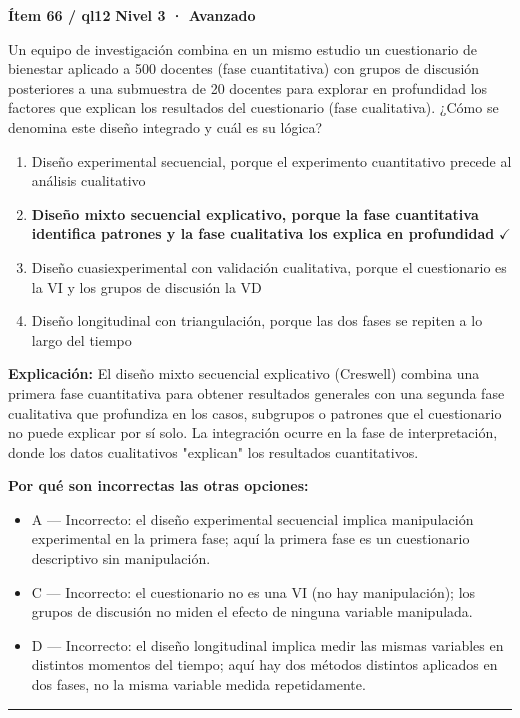 \documentclass[12pt,a4paper]{article}
\begin{document}
\begin{mdframed}[backgroundcolor=fondogris,linecolor=rojo,linewidth=1pt,innerleftmargin=10pt,innerrightmargin=10pt,innertopmargin=7pt,innerbottommargin=7pt]
\textbf{Ítem 66 / ql12} \hfill {\small\bfseries\color{rojo} Nivel 3 · Avanzado}
\end{mdframed}

Un equipo de investigación combina en un mismo estudio un cuestionario de bienestar aplicado a 500 docentes (fase cuantitativa) con grupos de discusión posteriores a una submuestra de 20 docentes para explorar en profundidad los factores que explican los resultados del cuestionario (fase cualitativa). ¿Cómo se denomina este diseño integrado y cuál es su lógica?

\begin{enumerate}
  \item[A.] Diseño experimental secuencial, porque el experimento cuantitativo precede al análisis cualitativo
  \item[\textbf{\color{verde}B.}] \textbf{\color{verde} Diseño mixto secuencial explicativo, porque la fase cuantitativa identifica patrones y la fase cualitativa los explica en profundidad} \hfill $\checkmark$
  \item[C.] Diseño cuasiexperimental con validación cualitativa, porque el cuestionario es la VI y los grupos de discusión la VD
  \item[D.] Diseño longitudinal con triangulación, porque las dos fases se repiten a lo largo del tiempo
\end{enumerate}

\noindent\textbf{\color{azul}Explicación:} El diseño mixto secuencial explicativo (Creswell) combina una primera fase cuantitativa para obtener resultados generales con una segunda fase cualitativa que profundiza en los casos, subgrupos o patrones que el cuestionario no puede explicar por sí solo. La integración ocurre en la fase de interpretación, donde los datos cualitativos "explican" los resultados cuantitativos.

\noindent\textbf{\color{gris}Por qué son incorrectas las otras opciones:}
\begin{itemize}
  \item {\small A — Incorrecto: el diseño experimental secuencial implica manipulación experimental en la primera fase; aquí la primera fase es un cuestionario descriptivo sin manipulación.}
  \item {\small C — Incorrecto: el cuestionario no es una VI (no hay manipulación); los grupos de discusión no miden el efecto de ninguna variable manipulada.}
  \item {\small D — Incorrecto: el diseño longitudinal implica medir las mismas variables en distintos momentos del tiempo; aquí hay dos métodos distintos aplicados en dos fases, no la misma variable medida repetidamente.}
\end{itemize}
\vspace{8pt}\hrule\vspace{10pt}
\end{document}
